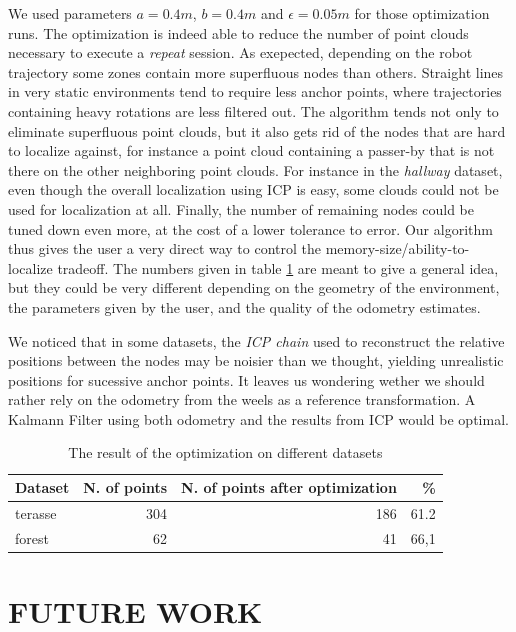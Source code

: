 \documentclass[letterpaper,10 pt,conference]{ieeeconf}
\begin{document}
We used parameters $a=0.4 m$, $b=0.4 m$ and $\epsilon=0.05 m$ for those optimization runs. The
optimization is indeed able to reduce the number of point clouds necessary to execute a
\textit{repeat} session. As exepected, depending on the robot trajectory some zones contain more
superfluous nodes than others. Straight lines in very static environments tend to require less
anchor points, where trajectories containing heavy rotations are less filtered out. The algorithm
tends not only to eliminate superfluous point clouds, but it also gets rid of the nodes that are
hard to localize against, for instance a point cloud containing a passer-by that is not there on the
other neighboring point clouds. For instance in the \textit{hallway} dataset, even though the
overall localization using ICP is easy, some clouds could not be used for localization at all.
Finally, the number of remaining nodes could be tuned down even more, at the cost of a lower
tolerance to error. Our algorithm thus gives the user a very direct way to control the
memory-size/ability-to-localize tradeoff. The numbers given in table
\ref{tabopti} are meant to give a general idea, but they could be very different depending on the
geometry of the environment, the parameters given by the user, and the quality of the odometry
estimates.

We noticed that in some datasets, the \textit{ICP chain} used to reconstruct the relative positions
between the nodes may be noisier than we thought, yielding unrealistic positions for sucessive
anchor points. It leaves us wondering wether we should rather rely on the odometry from the weels as
a reference transformation. A Kalmann Filter using both odometry and the results from ICP would be
optimal.

\begin{table}[h]
\centering
\begin{tabular}{|l|r|r|r|}
  \hline
Dataset & N. of points & N. of points after optimization & \% \\
\hline
terasse & 304 & 186 & 61.2 \\
  \hline
forest & 62 & 41 & 66,1 \\
  \hline
\end{tabular}
\caption{The result of the optimization on different datasets}
\label{tabopti}
\end{table}

\section{FUTURE WORK}
\end{document}

